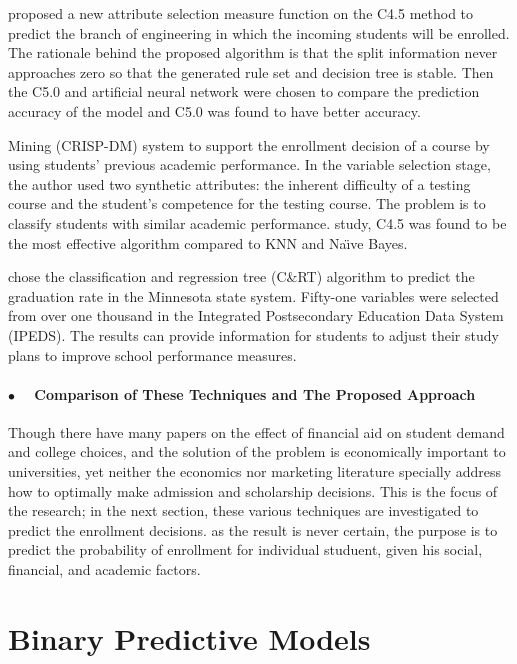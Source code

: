 \documentclass[12pt,english]{report}
\begin{document}
\citet{dt_enroll_india} proposed a new attribute selection measure function on
the C4.5 method to predict the branch of engineering in which the incoming
students will be enrolled. The rationale behind the proposed algorithm is that
the split information never approaches zero so that the generated rule set and
decision tree is stable. Then the C5.0 and artificial neural network were
chosen to compare the prediction accuracy of the model and C5.0 was found to
have better accuracy.

Mining (CRISP-DM) system to support the enrollment decision of a course by
using students' previous academic performance. In the variable selection stage,
the author used two synthetic attributes: the inherent difficulty of a testing
course and the student's competence for the testing course. The problem is to
classify students with similar academic performance. %
study, C4.5 was found to be the most effective algorithm compared to KNN and
Na{\"\i}ve Bayes.

\citet{Bailey2006} chose the classification and regression tree (C\&RT)
algorithm to predict the graduation rate in the Minnesota state system.
Fifty-one variables were selected from over one thousand in the Integrated
Postsecondary Education Data System (IPEDS). The results can provide
information for students to adjust their study plans to improve school
performance measures.


\subsubsection {$\bullet \quad$ Comparison of These Techniques and The Proposed
Approach}

\vspace{0.25in}
Though there have many papers on the effect of financial aid on student demand
and college choices, and the solution of the problem is economically important
to universities, yet neither the economics nor marketing literature specially
address how to optimally make admission and scholarship decisions.  This is the
focus of the research; in the next section, these various techniques are
investigated to predict the enrollment decisions.  as the result is never
certain, the purpose is to predict the probability of enrollment for individual
studuent, given his social, financial, and academic factors.

\chapter{Binary Predictive Models } %
\end{document}
